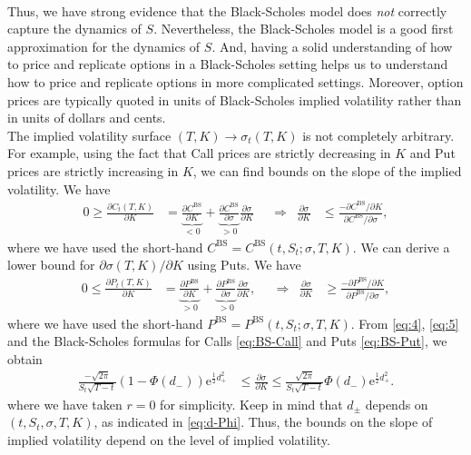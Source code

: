 \documentclass[12pt]{book}
\numberwithin{equation}{chapter}
\theoremstyle{plain}
\numberwithin{theorem}{section}
\theoremstyle{definition}
\numberwithin{exercise}{chapter}
\newcommand{\<}{\langle}
\renewcommand{\>}{\rangle}
\renewcommand{\(}{\left(}
\renewcommand{\)}{\right)}
\renewcommand{\[}{\left[}
\renewcommand{\]}{\right]}
\newcommand\sig{\sigma}
\renewcommand\d{\partial}
\newcommand\ee{\mathrm{e}}
\newcommand\BS{\textrm{BS}}
\theoremstyle{definition}
\numberwithin{question}{section}
\begin{document}
\\[0.5em]
Thus, we have strong evidence that the Black-Scholes model does \textit{not} correctly capture the dynamics of $S$.  Nevertheless, the Black-Scholes model is a good first approximation for the dynamics of $S$.  And, having a solid understanding of how to price and replicate options in a Black-Scholes setting helps us to understand how to price and replicate options in more complicated settings.  Moreover, option prices are typically quoted in units of Black-Scholes implied volatility rather than in units of dollars and cents.
\\[0.5em]
The implied volatility surface $(T,K) \rightarrow \sig_t(T,K)$ is not completely arbitrary. 
For example, using the fact that Call prices are strictly decreasing in $K$ and Put prices are strictly increasing in $K$, we can find bounds on the slope of the implied volatility.  We have
\begin{align}
0 \geq \frac{\d C_t(T,K)}{\d K} 
	&= \underbrace{\frac{\d C^\BS}{\d K}}_{<0} + \underbrace{ \frac{\d C^\BS}{\d \sigma} }_{>0} \frac{\d \sigma}{\d K}   &
	&\Rightarrow &
\frac{\d \sigma}{\d K} 
	&\leq \frac{-\d C^\BS / \d K}{\d C^\BS / \d \sigma} , \label{eq:4}
\end{align}
where we have used the short-hand $C^\BS = C^\BS(t,S_t;\sig,T,K)$.
We can derive a lower bound for $\d \sig(T,K)/\d K$ using Puts.  We have
\begin{align} 
0 \leq \frac{\d P_t(T,K)}{\d K} 
	&= \underbrace{\frac{\d P^\BS}{\d K}}_{>0} + \underbrace{\frac{\d P^\BS}{\d \sigma}}_{>0} \frac{\d \sigma}{\d K} , &
	&\Rightarrow &
\frac{\d \sigma}{\d K} 
	&\geq \frac{-\d P^\BS / \d K}{\d P^\BS / \d \sigma} , \label{eq:5}
\end{align}
where we have used the short-hand $P^\BS = P^\BS(t,S_t;\sig,T,K)$.
From \eqref{eq:4}, \eqref{eq:5} and the Black-Scholes formulas for Calls \eqref{eq:BS-Call} and Puts \eqref{eq:BS-Put}, we obtain
\begin{align} 
\frac{-\sqrt{2 \pi}}{S_t \sqrt{T-t}} (1 - \Phi(d_-)) \ee^{\frac{1}{2}d_+^2} 
	&\leq \frac{\d \sigma}{\d K} 
	 \leq \frac{\sqrt{2 \pi}}{S_t \sqrt{T-t}} \Phi(d_-) \ee^{\frac{1}{2} d_+^2}.
\end{align}
where we have taken $r=0$ for simplicity.  Keep in mind that $d_{\pm}$ depends on $(t,S_t,\sig,T,K)$, as indicated in \eqref{eq:d-Phi}.  Thus, the bounds on the slope of implied volatility depend on the level of implied volatility.


\end{document}
